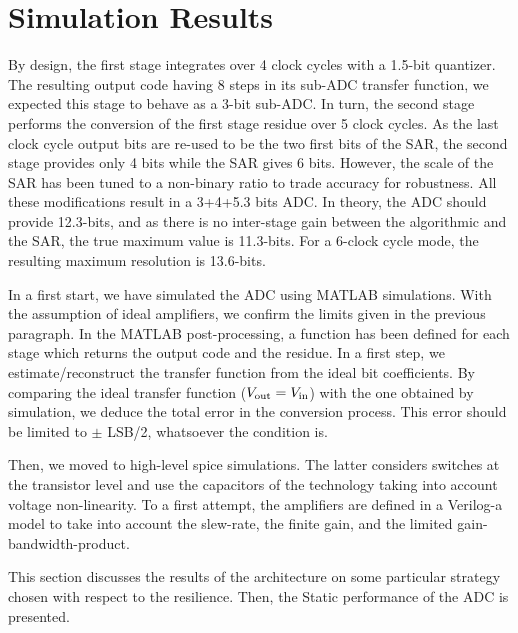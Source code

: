 
\section{Simulation Results}             %
By design, the first stage integrates over 4 clock cycles with a 1.5-bit quantizer. The resulting output code having 8 steps in its sub-ADC transfer function, we expected this stage to behave as a 3-bit sub-ADC\@. In turn, the second stage performs the conversion of the first stage residue over 5 clock cycles. As the last clock cycle output bits are re-used to be the two first bits of the SAR, the second stage provides only 4 bits while the SAR gives 6 bits. However, the scale of the SAR has been tuned to a non-binary ratio to trade accuracy for robustness. All these modifications result in a 3+4+5.3 bits ADC\@. In theory, the ADC should provide 12.3-bits, and as there is no inter-stage gain between the algorithmic and the SAR, the true maximum value is 11.3-bits. For a 6-clock cycle mode, the resulting maximum resolution is 13.6-bits.

In a first start, we have simulated the ADC using MATLAB simulations. With the assumption of ideal amplifiers, we confirm the limits given in the previous paragraph. In the MATLAB post-processing, a function has been defined for each stage which returns the output code and the residue. In a first step, we estimate/reconstruct the transfer function from the ideal bit coefficients. By comparing the ideal transfer function ($V_{\rm out} = V_{\rm in}$) with the one obtained by simulation, we deduce the total error in the conversion process. This error should be limited to $\pm$ LSB/2, whatsoever the condition is.

Then, we moved to high-level spice simulations. The latter considers switches at the transistor level and use the capacitors of the technology taking into account voltage non-linearity. To a first attempt, the amplifiers are defined in a Verilog-a model to take into account the slew-rate, the finite gain, and the limited gain-bandwidth-product.

This section discusses the results of the architecture on some particular strategy chosen with respect to the resilience. Then, the Static performance of the ADC is presented.

